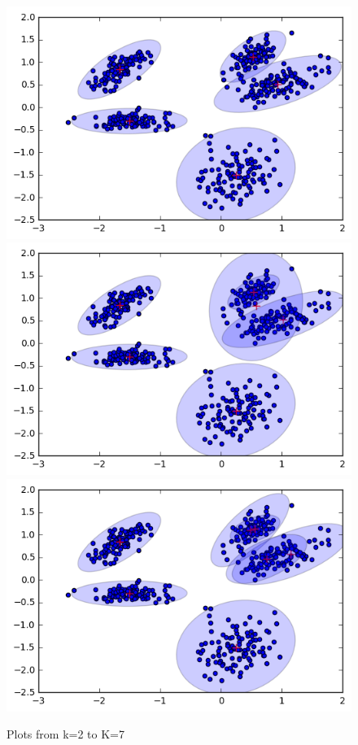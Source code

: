 \documentclass[a4paper,11pt]{article}
\begin{document}
\begin{figure}[htbp]
  \includegraphics[scale=0.3]{gmmnkmk5.png}
  \includegraphics[scale=0.3]{gmmnkmk6.png}
  \includegraphics[scale=0.3]{gmmnkmk7.png}
  \caption{Plots from k=2 to K=7 }
\end{figure}
\end{document}
